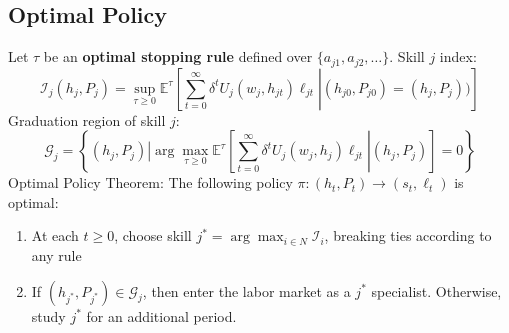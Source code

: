 \documentclass[10 pt]{article}
\newcommand{\ce}[2]{\left[\left. #1 \right\vert #2 \right]}
\begin{document}
\subsection{Optimal Policy}

Let $\tau$ be an \textbf{optimal stopping rule} defined over $\{ a_{j1}, a_{j2}, \dots \}$. Skill $j$ index: 
\begin{equation*}
\mathcal{I}_j (h_j, P_j) = \sup_{\tau \geq 0} \mathbb{E}^\tau
\ce{
   \sum_{t=0}^\infty \delta^t U_j (w_j, h_{jt}) \ell_{jt}}
   {(h_{j0}, P_{j0}) = (h_j, P_j))
}
\end{equation*}
Graduation region of skill $j$: 
\begin{equation*}
\mathcal{G}_j = \left\{\left. (h_j, P_j) \right\vert 
   \arg \max_{\tau \geq 0} 
   \mathbb{E}^\tau \ce{\sum_{t=0}^\infty \delta^t U_j (w_j, h_j) \ell_{jt}}
   {(h_j, P_j)} = 0
   \right\}
\end{equation*}
Optimal Policy Theorem: The following policy $\pi: (h_t, P_t) \to (s_t, \ell_t)$ is optimal:
\begin{enumerate}
	\item At each $t \geq 0$, choose skill $j^* = \arg \max_{i \in N} \mathcal{I}_i$, breaking ties according to any rule
	\item If $(h_{j^*}, P_{j^*}) \in \mathcal{G}_{j}$, then enter the labor market as a $j^*$ specialist. Otherwise, study $j^*$ for an additional period.  
\end{enumerate}
\end{document}
